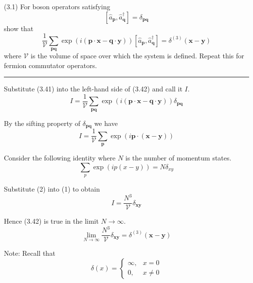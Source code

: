 \documentclass[12pt]{article}
\begin{document}
(3.1)
For boson operators satisfying
\begin{equation*}
\left[\hat a_{\mathbf p},\hat a_{\mathbf q}^\dag\right]=\delta_\mathbf{pq}
\tag{3.41}
\end{equation*}
show that
\begin{equation*}
\frac{1}{\mathcal V}\sum_\mathbf{pq}
\exp(i(\mathbf p\cdot\mathbf x-\mathbf q\cdot\mathbf y))
\left[\hat a_{\mathbf p},\hat a_{\mathbf q}^\dag\right]
=\delta^{(3)}(\mathbf x-\mathbf y)
\tag{3.42}
\end{equation*}
where $\mathcal V$ is the volume of space over which the system
is defined.
Repeat this for fermion commutator operators.

\bigskip
\hrule

\bigskip
Substitute (3.41) into the left-hand side of (3.42) and call it $I$.
\begin{equation*}
I=\frac{1}{\mathcal V}\sum_\mathbf{pq}
\exp(i(\mathbf p\cdot\mathbf x-\mathbf q\cdot\mathbf y))
\delta_\mathbf{pq}
\end{equation*}

By the sifting property of $\delta_\mathbf{pq}$ we have
\begin{equation*}
I=\frac{1}{\mathcal V}\sum_\mathbf{p}
\exp(i\mathbf p\cdot(\mathbf x-\mathbf y))
\tag{1}
\end{equation*}

Consider the following identity where $N$ is the number of momentum states.
\begin{equation*}
\sum_p\exp(ip(x-y))=N\delta_{xy}
\tag{2}
\end{equation*}

Substitute (2) into (1) to obtain
\begin{equation*}
I=\frac{N^3}{\mathcal V}\delta_\mathbf{xy}
\end{equation*}

Hence (3.42) is true in the limit $N\rightarrow\infty$.
\begin{equation*}
\lim_{N\rightarrow\infty}\frac{N^3}{\mathcal V}
\delta_\mathbf{xy}
=\delta^{(3)}(\mathbf x-\mathbf y)
\end{equation*}

Note: Recall that
\begin{equation*}
\delta(x)=\begin{cases}
\infty, & x=0
\\
0, & x\ne0
\end{cases}
\end{equation*}
\end{document}
